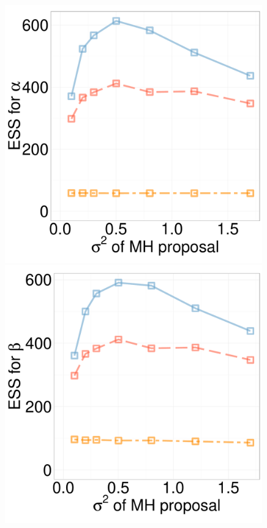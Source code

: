   \begin{figure}[H]
  \centering
  \begin{minipage}[!hp]{0.24\linewidth}
  \centering
    \includegraphics [width=0.99\textwidth, angle=0]{figs/ess/QC_D3alpha_k2.pdf}
\end{minipage}
  \begin{minipage}[hp]{0.24\linewidth}
  \centering
    \includegraphics [width=0.99\textwidth, angle=0]{figs/ess/QC_D3beta_k2.pdf}

\end{minipage}
\end{figure}
